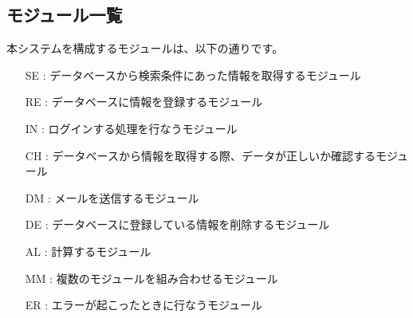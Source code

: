 \documentclass[a4j,titlepage]{jarticle}
\begin{document}
\subsection{モジュール一覧}
本システムを構成するモジュールは、以下の通りです。
\begin{enumerate}
\item [SE] : データベースから検索条件にあった情報を取得するモジュール
\item [RE] : データベースに情報を登録するモジュール
\item [IN] : ログインする処理を行なうモジュール
\item [CH] : データベースから情報を取得する際、データが正しいか確認するモジュール
\item [DM] : メールを送信するモジュール
\item [DE] : データベースに登録している情報を削除するモジュール
\item [AL] : 計算するモジュール
\item [MM] : 複数のモジュールを組み合わせるモジュール
\item [ER] : エラーが起こったときに行なうモジュール
\end{enumerate}
\end{document}
